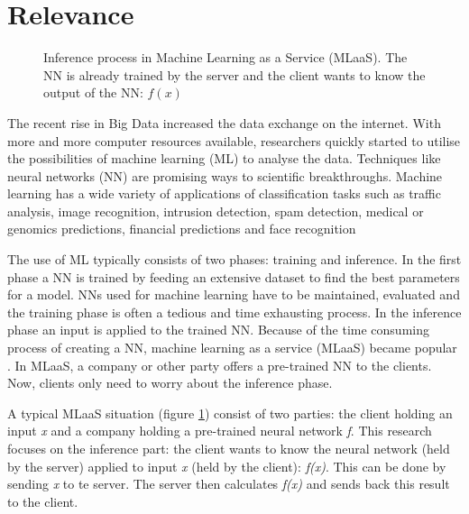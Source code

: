 \documentclass[../thesis.tex]{subfiles}
\begin{document}
\section{Relevance}
\begin{figure}
    \centering
       
    \caption{Inference process in Machine Learning as a Service (MLaaS). The NN is already trained by the server and the client wants to know the output of the NN: $f(x)$}
    \label{fig:mlaas}
\end{figure}
The recent rise in Big Data increased the data exchange on the internet. With more and more computer resources available, researchers quickly started to utilise the possibilities of machine learning (ML) to analyse the data.  Techniques like neural networks (NN) are promising ways to scientific breakthroughs. Machine learning has a wide variety of applications of classification tasks such as traffic analysis, image recognition, intrusion detection,  spam detection, medical or genomics predictions,  financial predictions and face recognition \parencite{dowlin2017,islam2011, bachrach16, kaiming215}

The use of ML typically consists of two phases: training and inference. In the first phase a NN is trained by feeding an extensive dataset to find the best parameters for a model. NNs used for machine learning have to be maintained, evaluated and the training phase is often a tedious and time exhausting process. In the inference phase an input is applied to the trained NN. Because of the time consuming process of creating a NN, machine learning as a service (MLaaS) became popular \parencite{ribeiro2015mlaasml}. In MLaaS, a company or other party offers a pre-trained NN to the clients. Now, clients only need to worry about the inference phase.


A typical MLaaS situation (figure \ref{fig:mlaas}) consist of two parties: the client holding an input \textit{x} and a company holding a pre-trained neural network \textit{f}. This research focuses on the inference part: the client wants to know the neural network (held by the server) applied to input \textit{x} (held by the client): \textit{f(x)}. This can be done by sending \textit{x} to te server. The server then calculates \textit{f(x)} and sends back this result to the client.

\end{document}
